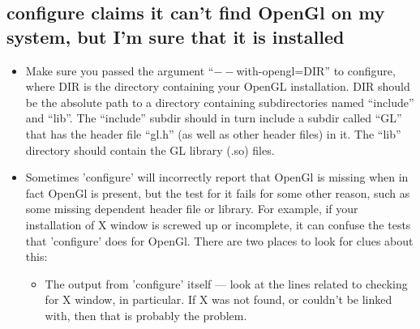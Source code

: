 \documentclass[12pt,a4paper]{article}
\begin{document}
    \subsection{configure claims it can't find OpenGl on my system, but I'm sure that it is installed}
    \label{aswer:OpenGl}
        \begin{itemize}
          \item Make sure you passed the argument ``$--$with-opengl=DIR'' to configure,
            where DIR is the directory containing your OpenGL installation. DIR
            should be the absolute path to a directory containing subdirectories
            named ``include'' and ``lib''. The ``include'' subdir should in turn
            include a subdir called ``GL'' that has the header file ``gl.h'' (as
            well as other header files) in it. The ``lib'' directory should
            contain the GL library (.so) files.

          \item Sometimes 'configure' will incorrectly report that OpenGl is missing
            when in fact OpenGl is present, but the test for it fails for some
            other reason, such as some missing dependent header file or library.
            For example, if your installation of X window is screwed up or
            incomplete, it can confuse the tests that 'configure' does for
            OpenGl. There are two places to look for clues about this:
              \begin{itemize}
              \item The output from 'configure' itself --- look at the lines related
                to checking for X window, in particular. If X was not found, or
                couldn't be linked with, then that is probably the problem.


\end{itemize}
\end{itemize}
\end{document}
